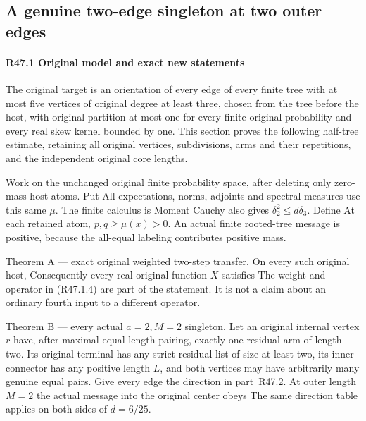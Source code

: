 \subsection{A genuine two-edge singleton at two outer edges}\label{proof:R2-C047}
\paragraph{R47.1 Original model and exact new statements}

The original target is an orientation of every edge of every finite tree
with at most five vertices of original degree at least three, chosen from
the tree before the host, with original partition at most one for every
finite original probability and every real skew kernel bounded by one.
This section proves the following half-tree estimate, retaining all
original vertices, subdivisions, arms and their repetitions, and the
independent original core lengths.

Work on the unchanged original finite probability space, after deleting
only zero-mass host atoms. Put
All expectations, norms, adjoints and spectral measures use this same \(\mu\).
The finite calculus is
Moment Cauchy also gives \(\delta_2^2\le d \delta_3.\) Define
At each retained atom, \(p,q\ge\mu(x)>0\). An actual finite rooted-tree
message is positive, because the all-equal labeling contributes positive
mass. 

Theorem A — exact original weighted two-step transfer. On every such
original host,
Consequently every real original function \(X\) satisfies
The weight and operator in (R47.1.4) are part of the statement. It is not a
claim about an ordinary fourth input to a different operator.

Theorem B — every actual \(a=2,\allowbreak  M=2\) singleton. Let an original internal
vertex \(r\) have, after maximal equal-length pairing, exactly one residual
arm of length two. Its original terminal has any strict residual list of
size at least two, its inner connector has any positive length \(L\), and
both vertices may have arbitrarily many genuine equal pairs. Give every
edge the direction in \mbox{\hyperref[part:R47.2]{part R47.2}}. At outer length \(M=2\) the actual message
into the original center obeys
The same direction table applies on both sides of \(d=6/25\).

